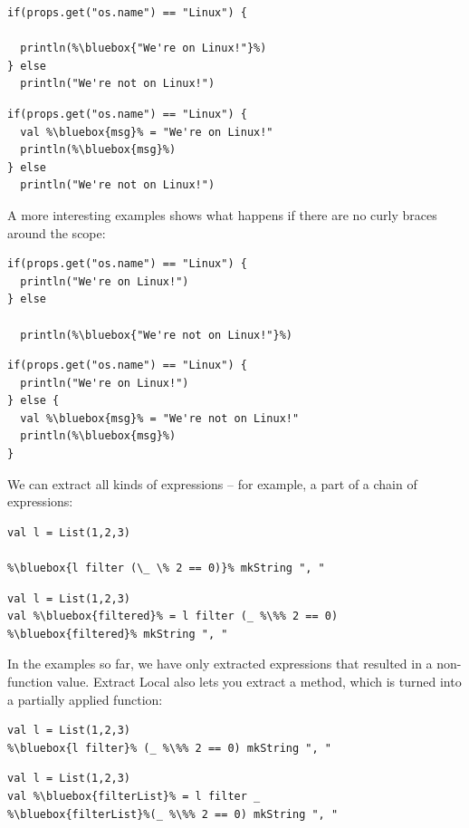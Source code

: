 \documentclass[10pt,a4paper,oneside]{scrreprt}
\begin{document}
\begin{multicols}{2}
\begin{lstlisting}
if(props.get("os.name") == "Linux") {

  println(%\bluebox{"We're on Linux!"}%)
} else
  println("We're not on Linux!")
\end{lstlisting}
\begin{lstlisting}
if(props.get("os.name") == "Linux") {
  val %\bluebox{msg}% = "We're on Linux!"
  println(%\bluebox{msg}%)
} else
  println("We're not on Linux!")
\end{lstlisting}
\end{multicols}

A more interesting examples shows what happens if there are no curly braces around the scope:

\begin{multicols}{2}
\begin{lstlisting}
if(props.get("os.name") == "Linux") {
  println("We're on Linux!")
} else

  println(%\bluebox{"We're not on Linux!"}%)

\end{lstlisting}
\begin{lstlisting}
if(props.get("os.name") == "Linux") {
  println("We're on Linux!")
} else {
  val %\bluebox{msg}% = "We're not on Linux!"
  println(%\bluebox{msg}%)
}
\end{lstlisting}
\end{multicols}

We can extract all kinds of expressions -- for example, a part of a chain of expressions:

\begin{multicols}{2}
\begin{lstlisting}
val l = List(1,2,3)

%\bluebox{l filter (\_ \% 2 == 0)}% mkString ", "
\end{lstlisting}
\begin{lstlisting}
val l = List(1,2,3) 
val %\bluebox{filtered}% = l filter (_ %\%% 2 == 0)
%\bluebox{filtered}% mkString ", "
\end{lstlisting}
\end{multicols}

In the examples so far, we have only extracted expressions that resulted in a non-function value. Extract Local also lets you extract a method, which is turned into a partially applied function:

\begin{multicols}{2}
\begin{lstlisting}
val l = List(1,2,3)
%\bluebox{l filter}% (_ %\%% 2 == 0) mkString ", "

\end{lstlisting}
\begin{lstlisting}
val l = List(1,2,3) 
val %\bluebox{filterList}% = l filter _
%\bluebox{filterList}%(_ %\%% 2 == 0) mkString ", "
\end{lstlisting}
\end{multicols}
\end{document}
